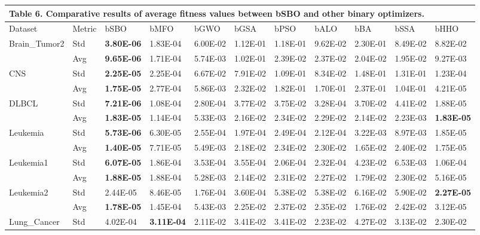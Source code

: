 \documentclass{article} %
\begin{document}
\begin{tabular}{|p{0.4in}|p{0.4in}|p{0.4in}|p{0.4in}|p{0.4in}|p{0.4in}|p{0.4in}|p{0.4in}|p{0.4in}|p{0.4in}|p{0.4in}|} \hline 
\multicolumn{11}{|p{1in}|}{\textbf{Table }6\textbf{. }Comparative results of average fitness values between bSBO and other binary optimizers.\textbf{}} \\ \hline 
Dataset & Metric & bSBO & bMFO & bGWO & bGSA & bPSO & bALO & bBA & bSSA & bHHO \\ \hline 
Brain\_Tumor2 & Std & \textbf{3.80E-06} & 1.83E-04 & 6.00E-02 & 1.12E-01 & 1.18E-01 & 9.62E-02 & 2.30E-01 & 8.49E-02 & 8.82E-02 \\ \hline 
 & Avg & \textbf{9.65E-06} & 1.71E-04 & 5.74E-03 & 1.02E-01 & 2.39E-02 & 2.37E-02 & 2.04E-02 & 1.95E-02 & 9.27E-03 \\ \hline 
CNS & Std & \textbf{2.25E-05} & 2.25E-04 & 6.67E-02 & 7.91E-02 & 1.09E-01 & 8.34E-02 & 1.48E-01 & 1.31E-01 & 1.23E-04 \\ \hline 
 & Avg & \textbf{1.75E-05} & 2.77E-04 & 5.86E-03 & 2.32E-02 & 1.82E-01 & 1.70E-01 & 2.37E-01 & 1.04E-01 & 4.21E-05 \\ \hline 
DLBCL & Std & \textbf{7.21E-06} & 1.08E-04 & 2.80E-04 & 3.77E-02 & 3.75E-02 & 3.28E-04 & 3.70E-02 & 4.41E-02 & 1.88E-05 \\ \hline 
 & Avg & \textbf{1.83E-05} & 1.14E-04 & 5.33E-03 & 2.16E-02 & 2.34E-02 & 2.29E-02 & 2.14E-02 & 2.23E-03 & \textbf{1.83E-05} \\ \hline 
Leukemia & Std & \textbf{5.73E-06} & 6.30E-05 & 2.55E-04 & 1.97E-04 & 2.49E-04 & 2.12E-04 & 3.22E-03 & 8.97E-03 & 1.85E-05 \\ \hline 
 & Avg & \textbf{1.40E-05} & 7.71E-05 & 5.49E-03 & 2.18E-02 & 2.34E-02 & 2.30E-02 & 1.65E-02 & 2.40E-02 & 1.75E-05 \\ \hline 
Leukemia1 & Std & \textbf{6.07E-05} & 1.86E-04 & 3.53E-04 & 3.55E-04 & 2.06E-04 & 2.32E-04 & 4.23E-02 & 6.53E-03 & 1.06E-04 \\ \hline 
 & Avg & \textbf{1.88E-05} & 1.88E-04 & 5.28E-03 & 2.14E-02 & 2.31E-02 & 2.27E-02 & 1.79E-02 & 2.30E-02 & 5.16E-05 \\ \hline 
Leukemia2 & Std & 2.44E-05 & 8.46E-05 & 1.76E-04 & 3.60E-04 & 5.38E-02 & 5.38E-02 & 6.16E-02 & 5.90E-02 & \textbf{2.27E-05} \\ \hline 
 & Avg & \textbf{1.78E-05} & 1.45E-04 & 5.43E-03 & 2.25E-02 & 2.37E-02 & 2.35E-02 & 1.76E-02 & 2.42E-02 & 3.12E-05 \\ \hline 
Lung\_Cancer & Std & 4.02E-04 & \textbf{3.11E-04} & 2.11E-02 & 3.41E-02 & 3.41E-02 & 2.23E-02 & 4.27E-02 & 3.13E-02 & 2.30E-02 \\ \hline 

\end{tabular}
\end{document}
